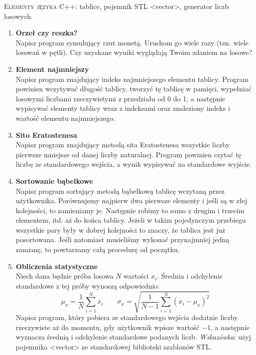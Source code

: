 \documentclass[12pt]{article}
\begin{document}
\small \textsc{Elementy języka C++:} tablice, pojemnik STL <vector>, generator liczb losowych.

\begin{enumerate}

\item \textbf{Orzeł czy reszka?}\\
Napisz program symulujący rzut monetą. Uruchom go wiele razy (tzn. wiele losowań w pętli). Czy uzyskane wyniki wyglądają Twoim zdaniem na losowe?

\item \textbf{Element najmniejszy}\\
Napisz program znajdujący indeks najmniejszego elementu tablicy. Program powinien wczytywać długość tablicy, tworzyć tę tablicę w pamięci, wypełniać losowymi liczbami rzeczywistymi z przedziału od 0 do 1, a następnie wypisywać elementy tablicy wraz z indeksami oraz znaleziony indeks i wartość elementu najmniejszego.

\item \textbf{Sito Eratostenesa}\\
Napisz program znajdujący metodą sita Eratostenesa wszystkie liczby pierwsze mniejsze od danej liczby naturalnej. Program powinien czytać tę liczbę ze standardowego wejścia, a wynik wypisywać na standardowe wyjście.

\item \textbf{Sortowanie bąbelkowe}\\
Napisz program sortujący metodą bąbelkową tablicę wczytaną przez użytkownika. Porównujemy najpierw dwa pierwsze elementy i jeśli są w złej kolejności, to zamieniamy je. Następnie robimy to samo z drugim i trzecim elementem, itd. aż do końca tablicy. Jeżeli w takim pojedynczym przebiegu wszystkie pary były w dobrej kolejności to znaczy, że tablica jest już posortowana. Jeśli natomiast musieliśmy wykonać przynajmniej jedną zamianę, to powtarzamy całą procedurę od początku. 

\item \textbf{Obliczenia statystyczne}\\
Niech dana będzie próba losowa $N$ wartości $x_i$. Średnia i odchylenie standardowe z tej próby wynoszą odpowiednio:
\[
\mu_x=\frac{1}{N}\sum_{i=1}^{N} x_i \quad \quad \sigma_x=\sqrt{\frac{1}{N-1}\sum_{i=1}^{N}(x_i-\mu_x)^2}
\]
Napisz program, który pobiera ze standardowego wejścia dodatnie liczby rzeczywiste aż do momentu, gdy użytkownik wpisze wartość $-1$, a następnie wyznacza średnią i odchylenie standardowe podanych liczb. \textit{Wskazówka}: użyj pojemnika <vector> ze standardowej biblioteki szablonów STL.


\end{enumerate}
\end{document}
